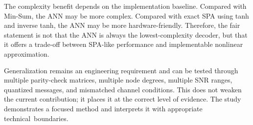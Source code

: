 The complexity benefit depends on the implementation baseline. Compared with Min-Sum, the ANN may be more complex. Compared with exact SPA using tanh and inverse tanh, the ANN may be more hardware-friendly. Therefore, the fair statement is not that the ANN is always the lowest-complexity decoder, but that it offers a trade-off between SPA-like performance and implementable nonlinear approximation.

Generalization remains an engineering requirement and can be tested through multiple parity-check matrices, multiple node degrees, multiple SNR ranges, quantized messages, and mismatched channel conditions. This does not weaken the current contribution; it places it at the correct level of evidence. The study demonstrates a focused method and interprets it with appropriate technical~boundaries.
